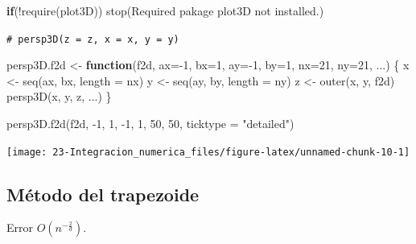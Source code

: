 \documentclass[
]{book}
\newenvironment{Shaded}{\begin{snugshade}}{\end{snugshade}}
\newcommand{\AttributeTok}[1]{\textcolor[rgb]{0.77,0.63,0.00}{#1}}
\newcommand{\CommentTok}[1]{\textcolor[rgb]{0.56,0.35,0.01}{\textit{#1}}}
\newcommand{\ControlFlowTok}[1]{\textcolor[rgb]{0.13,0.29,0.53}{\textbf{#1}}}
\newcommand{\DecValTok}[1]{\textcolor[rgb]{0.00,0.00,0.81}{#1}}
\newcommand{\FunctionTok}[1]{\textcolor[rgb]{0.00,0.00,0.00}{#1}}
\newcommand{\NormalTok}[1]{#1}
\newcommand{\OtherTok}[1]{\textcolor[rgb]{0.56,0.35,0.01}{#1}}
\newcommand{\SpecialCharTok}[1]{\textcolor[rgb]{0.00,0.00,0.00}{#1}}
\newcommand{\StringTok}[1]{\textcolor[rgb]{0.31,0.60,0.02}{#1}}
\theoremstyle{break}
\theoremstyle{nonumberplain}
\renewcommand{\CommentTok}[1]{\textcolor[rgb]{0.41,0.41,0.41}{\texttt{#1}}}
\begin{document}
\begin{Shaded}
\begin{Highlighting}[]
\ControlFlowTok{if}\NormalTok{(}\SpecialCharTok{!}\FunctionTok{require}\NormalTok{(plot3D)) }\FunctionTok{stop}\NormalTok{(}\StringTok{\textquotesingle{}Required pakage \textasciigrave{}plot3D\textasciigrave{} not installed.\textquotesingle{}}\NormalTok{)}

\CommentTok{\# persp3D(z = z, x = x, y = y)}

\NormalTok{persp3D.f2d }\OtherTok{\textless{}{-}} \ControlFlowTok{function}\NormalTok{(f2d, }\AttributeTok{ax=}\SpecialCharTok{{-}}\DecValTok{1}\NormalTok{, }\AttributeTok{bx=}\DecValTok{1}\NormalTok{, }\AttributeTok{ay=}\SpecialCharTok{{-}}\DecValTok{1}\NormalTok{, }\AttributeTok{by=}\DecValTok{1}\NormalTok{, }\AttributeTok{nx=}\DecValTok{21}\NormalTok{, }\AttributeTok{ny=}\DecValTok{21}\NormalTok{, ...) \{ }
\NormalTok{  x }\OtherTok{\textless{}{-}} \FunctionTok{seq}\NormalTok{(ax, bx, }\AttributeTok{length =}\NormalTok{ nx)}
\NormalTok{  y }\OtherTok{\textless{}{-}} \FunctionTok{seq}\NormalTok{(ay, by, }\AttributeTok{length =}\NormalTok{ ny)}
\NormalTok{  z }\OtherTok{\textless{}{-}} \FunctionTok{outer}\NormalTok{(x, y, f2d)}
  \FunctionTok{persp3D}\NormalTok{(x, y, z, ...)}
\NormalTok{\}}

\FunctionTok{persp3D.f2d}\NormalTok{(f2d, }\SpecialCharTok{{-}}\DecValTok{1}\NormalTok{, }\DecValTok{1}\NormalTok{, }\SpecialCharTok{{-}}\DecValTok{1}\NormalTok{, }\DecValTok{1}\NormalTok{, }\DecValTok{50}\NormalTok{, }\DecValTok{50}\NormalTok{, }\AttributeTok{ticktype =} \StringTok{"detailed"}\NormalTok{) }
\end{Highlighting}
\end{Shaded}

\begin{center}\texttt{[image: 23-Integracion\_numerica\_files/figure-latex/unnamed-chunk-10-1]} \end{center}

\hypertarget{muxe9todo-del-trapezoide-1}{%
\subsection{Método del trapezoide}\label{muxe9todo-del-trapezoide-1}}

Error \(O(n^{-\frac{2}{d}})\).
\end{document}

